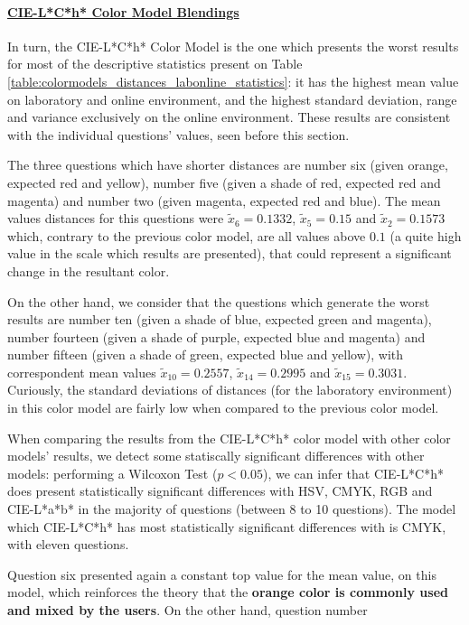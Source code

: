 \paragraph{\ul{CIE-L*C*h* Color Model Blendings}} \par
\label{par:lchcolormodel}
%
In turn, the CIE-L*C*h* Color Model is the one which presents the worst results for most of the descriptive statistics present on Table \ref{table:colormodels_distances_labonline_statistics}: it has the highest
mean value on laboratory and online environment, and the highest standard deviation, range and variance exclusively on the online environment. These results are consistent with the individual questions' values, seen before this
section. \par
%
The three questions which have shorter distances are number six (given orange, expected red and yellow), number five (given a shade of red, expected red and magenta) and number two (given magenta, expected red
and blue). The mean values distances for this questions were $\tilde{x}_{6} = 0.1332$, $\tilde{x}_{5} = 0.15$ and $\tilde{x}_{2} = 0.1573$ which, contrary to the previous color model, are all values above $0.1$ (a quite
high value in the scale which results are presented), that could represent a significant change in the resultant color. \par
%
On the other hand, we consider that the questions which generate the worst results are number ten (given a shade of blue, expected green and magenta), number fourteen (given a shade of purple, expected blue and magenta) and number
fifteen (given a shade of green, expected blue and yellow), with correspondent mean values $\tilde{x}_{10} = 0.2557$, $\tilde{x}_{14} = 0.2995$ and $\tilde{x}_{15} = 0.3031$. Curiously, the standard deviations of distances (for the
laboratory environment) in this color model are fairly low when compared to the previous color model. \par
%
When comparing the results from the CIE-L*C*h* color model with other color models' results, we detect some statiscally significant differences with other models: performing a Wilcoxon Test ($p < 0.05$), we can infer that CIE-L*C*h* does
present statistically significant differences with HSV, CMYK, RGB and CIE-L*a*b* in the majority of questions (between 8 to 10 questions). The model which CIE-L*C*h* has most statistically significant differences with is CMYK, with eleven questions. \par
%
Question six presented again a constant top value for the mean value, on this model, which reinforces the theory that the \textbf{orange color is commonly used and mixed by the users}. On the other hand, question number
